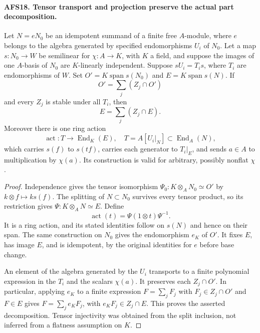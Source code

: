 \paragraph{AFS18. Tensor transport and projection preserve the actual part decomposition.}
\label{claim:AFS18}
Let $N=eN_0$ be an idempotent summand of a finite free
$A$-module, where $e$ belongs to the algebra generated
by specified endomorphisms $U_i$ of $N_0$.  Let a map
$s:N_0\to W$ be semilinear for $\chi:A\to K$, with
$K$ a field, and suppose the images of one $A$-basis of
$N_0$ are $K$-linearly independent.  Suppose
$sU_i=T_is$, where $T_i$ are endomorphisms of $W$.
Set $O'=K\operatorname{span}s(N_0)$ and
$E=K\operatorname{span}s(N)$.  If
\[
 O'=\sum_j(Z_j\cap O')
\]
and every $Z_j$ is stable under all $T_i$, then
\[
 E=\sum_j(Z_j\cap E).
\]
Moreover there is one ring action
\[
 \operatorname{act}:T\longrightarrow\operatorname{End}_K(E),
 \quad T=A[U_i|_N]\subset\operatorname{End}_A(N),
\]
which carries $s(f)$ to $s(tf)$, carries each generator
to $T_i|_E$, and sends $a\in A$ to multiplication by
$\chi(a)$.  Its construction is valid for arbitrary,
possibly nonflat $\chi$.
\begin{proof}
Independence gives the tensor isomorphism
$\Psi_0:K\otimes_A N_0\simeq O'$ by
$k\otimes f\mapsto ks(f)$.  The splitting of $N\subset N_0$
survives every tensor product, so its restriction gives
$\Psi:K\otimes_A N\simeq E$.  Define
\[
 \operatorname{act}(t)=\Psi(1\otimes t)\Psi^{-1}.
\]
It is a ring action, and its stated identities follow
on $s(N)$ and hence on their span.  The same construction
on $N_0$ gives the endomorphism $e_K$ of $O'$.  It fixes
$E$, has image $E$, and is idempotent, by the original
identities for $e$ before base change.

An element of the algebra generated by the $U_i$
transports to a finite polynomial expression in the
$T_i$ and the scalars $\chi(a)$.  It preserves each
$Z_j\cap O'$.  In particular, applying $e_K$ to a finite
expression $F=\sum_jF_j$ with $F_j\in Z_j\cap O'$ and
$F\in E$ gives
$F=\sum_je_KF_j$, with $e_KF_j\in Z_j\cap E$.
This proves the asserted decomposition.  Tensor
injectivity was obtained from the split inclusion,
not inferred from a flatness assumption on $K$.
\end{proof}

